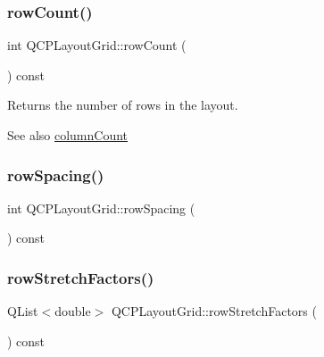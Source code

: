 \subsubsection{\texorpdfstring{rowCount()}{rowCount()}}
{\footnotesize\ttfamily int Q\+C\+P\+Layout\+Grid\+::row\+Count (\begin{DoxyParamCaption}{ }\end{DoxyParamCaption}) const\hspace{0.3cm}{\ttfamily [inline]}}

Returns the number of rows in the layout.

\begin{DoxySeeAlso}{See also}
\mbox{\hyperlink{class_q_c_p_layout_grid_a1a2962cbf45011405b64b913afa8e7a2}{column\+Count}} 
\end{DoxySeeAlso}
\mbox{\label{class_q_c_p_layout_grid_a4cb6c680505cd0ce6f85b9e217fd2cd0}} 
\subsubsection{\texorpdfstring{rowSpacing()}{rowSpacing()}}
{\footnotesize\ttfamily int Q\+C\+P\+Layout\+Grid\+::row\+Spacing (\begin{DoxyParamCaption}{ }\end{DoxyParamCaption}) const\hspace{0.3cm}{\ttfamily [inline]}}

\mbox{\label{class_q_c_p_layout_grid_aa33408586427e77e05f79defde7f3568}} 
\subsubsection{\texorpdfstring{rowStretchFactors()}{rowStretchFactors()}}
{\footnotesize\ttfamily Q\+List$<$double$>$ Q\+C\+P\+Layout\+Grid\+::row\+Stretch\+Factors (\begin{DoxyParamCaption}{ }\end{DoxyParamCaption}) const\hspace{0.3cm}{\ttfamily [inline]}}

\mbox{\label{class_q_c_p_layout_grid_a3a49272aba32bb0fddc3bb2a45a3dba0}} 
